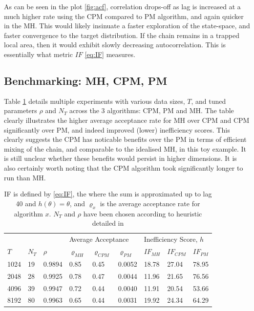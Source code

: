 \documentclass{article}
\begin{document}
As can be seen in the plot \ref{fig:acf}, correlation drops-off as lag is increased at a much higher rate using the CPM compared to PM algorithm, and again quicker in the MH. This would likely insinuate a faster exploration of the state-space, and faster convergence to the target distribution. If the chain remains in a trapped local area, then it would exhibit slowly decreasing autocorrelation. This is essentially what metric $IF$ \eqref{eq:IF} measures.

\subsection{Benchmarking: MH, CPM, PM}

Table \ref{tab:table} details multiple experiments with various data sizes, $T$, and tuned parameters $\rho$ and $N_T$ across the 3 algorithms: CPM, PM and MH. The table clearly illustrates the higher average acceptance rate for MH over CPM and CPM significantly over PM, and indeed improved (lower) inefficiency scores. This clearly suggests the CPM has noticable benefits over the PM in terms of efficient mixing of the chain, and comparable to the idealised MH, in this toy example. It is still unclear whether these benefits would persist in higher dimensions. It is also certainly worth noting that the CPM algorithm took significantly longer to run than MH.

\begin{table}[H]
\centering
\begin{tabular}{|l|ll|lll|lll|}
\hline
     & \multicolumn{2}{l|}{} & \multicolumn{3}{l|}{Average Acceptance}           & \multicolumn{3}{l|}{Inefficiency Score, $h$} \\
$T$  & $N_T$     & $\rho$    & $\varrho_{MH}$ & $\varrho_{CPM}$ & $\varrho_{PM}$ & $IF_{MH}$     & $IF_{CPM}$    & $IF_{PM}$    \\ \hline
1024 & 19        & 0.9894    & 0.85           & 0.45            & 0.0052         & 18.78         & 27.04         & 78.95        \\
2048 & 28        & 0.9925    & 0.78           & 0.47            & 0.0044         & 11.96         & 21.65         & 76.56        \\
4096 & 39        & 0.9947    & 0.72          & 0.44            & 0.0040         & 11.91         & 20.54         & 53.66        \\
8192 & 80        & 0.9963    & 0.65           & 0.44            & 0.0031         & 19.92         & 24.34         & 64.29        \\ \hline
\end{tabular}
\caption{IF is defined by \eqref{eq:IF}, the where the sum is approximated up to lag 40 and $h(\theta)=\theta$, and $\varrho_{x}$ is the average acceptance rate for algorithm $x$. $N_T$ and $\rho$ have been chosen according to heuristic detailed in \cite{cpmmDeligiannidis2015}}
\label{tab:table}
\end{table}
\end{document}
